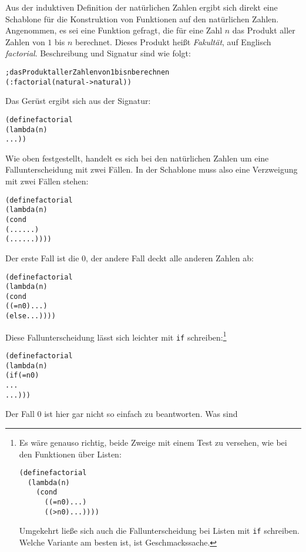 Aus der induktiven Definition der natürlichen Zahlen ergibt sich direkt eine Schablone für die
Konstruktion von Funktionen auf den natürlichen Zahlen.  Angenommen,
es sei eine Funktion gefragt, die für eine Zahl $n$ das Produkt aller
Zahlen von $1$ bis $n$ berechnet. 
Dieses Produkt heißt 
\textit{Fakultät}, auf Englisch
\textit{factorial}. 
  Beschreibung und Signatur sind wie folgt:
%
\begin{alltt}
; das Produkt aller Zahlen von 1 bis n berechnen
(: factorial (natural -> natural))
\end{alltt}
\label{page:factorial}
%
Das Gerüst ergibt sich aus der Signatur:
%
\begin{alltt}
(define factorial
  (lambda (n)
    ...))
\end{alltt}
%
Wie oben festgestellt, handelt es sich bei den natürlichen Zahlen um
eine Fallunterscheidung mit zwei Fällen.  In der Schablone muss also
eine Verzweigung mit zwei Fällen stehen:
%
\begin{alltt}
(define factorial
  (lambda (n)
    (cond
      (... ...)
      (... ...))))
\end{alltt}
%
Der erste Fall ist die $0$, der andere Fall deckt alle anderen Zahlen
ab:
%
\begin{alltt}
(define factorial
  (lambda (n)
    (cond
      ((= n 0) ...)
      (else ...))))
\end{alltt}
%
Diese Fallunterscheidung lässt sich leichter mit \texttt{if}
schreiben:\footnote{Es wäre genauso richtig, beide Zweige
  mit einem Test zu versehen, wie bei den Funktionen über Listen:
%
\begin{alltt}
(define factorial\\
\hspace*{0em}~~(lambda (n)\\
\hspace*{0em}~~~~(cond\\
\hspace*{0em}~~~~~~((= n 0) ...)\\
\hspace*{0em}~~~~~~((> n 0) ...))))
\end{alltt}
%
Umgekehrt ließe sich auch die Fallunterscheidung bei 
Listen mit \texttt{if} schreiben.  Welche
Variante am besten ist, ist Geschmackssache.}
%
\begin{alltt}
(define factorial
  (lambda (n)
    (if (= n 0)
        ...
        ...)))
\end{alltt}
%
Der Fall $0$ ist hier gar nicht so einfach zu beantworten.  Was sind
